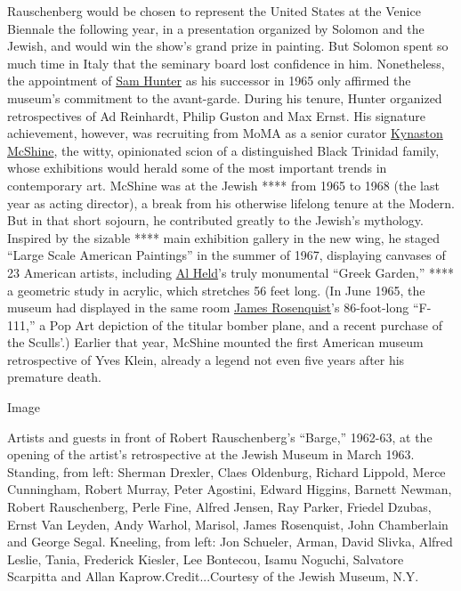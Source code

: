 Rauschenberg would be chosen to represent the United States at the
Venice Biennale the following year, in a presentation organized by
Solomon and the Jewish, and would win the show's grand prize in
painting. But Solomon spent so much time in Italy that the seminary
board lost confidence in him. Nonetheless, the appointment of
\href{https://www.nytimes3xbfgragh.onion/2014/08/26/arts/sam-hunter-curator-and-museum-founder-dies-at-91.html}{Sam
Hunter} as his successor in 1965 only affirmed the museum's commitment
to the avant-garde. During his tenure, Hunter organized retrospectives
of Ad Reinhardt, Philip Guston and Max Ernst. His signature achievement,
however, was recruiting from MoMA as a senior curator
\href{https://stories.thejewishmuseum.org/the-jewish-museum-remembers-kynaston-mcshine-1d6741c02815}{Kynaston
McShine}, the witty, opinionated scion of a distinguished Black Trinidad
family, whose exhibitions would herald some of the most important trends
in contemporary art. McShine was at the Jewish **** from 1965 to 1968
(the last year as acting director), a break from his otherwise lifelong
tenure at the Modern. But in that short sojourn, he contributed greatly
to the Jewish's mythology. Inspired by the sizable **** main exhibition
gallery in the new wing, he staged ``Large Scale American Paintings'' in
the summer of 1967, displaying canvases of 23 American artists,
including
\href{https://www.nytimes3xbfgragh.onion/2016/05/02/t-magazine/art/al-held-brushstroke-drawings.html}{Al
Held}'s truly monumental ``Greek Garden,'' **** a geometric study in
acrylic, which stretches 56 feet long. (In June 1965, the museum had
displayed in the same room
\href{https://www.nytimes3xbfgragh.onion/2016/03/18/arts/design/james-rosenquist-and-erro-discuss-a-long-friendship-forged-in-pop-art.html}{James
Rosenquist}'s 86-foot-long ``F-111,'' a Pop Art depiction of the titular
bomber plane, and a recent purchase of the Sculls'.) Earlier that year,
McShine mounted the first American museum retrospective of Yves Klein,
already a legend not even five years after his premature death.

Image

Artists and guests in front of Robert Rauschenberg's ``Barge,'' 1962-63,
at the opening of the artist's retrospective at the Jewish Museum in
March 1963. Standing, from left: Sherman Drexler, Claes Oldenburg,
Richard Lippold, Merce Cunningham, Robert Murray, Peter Agostini, Edward
Higgins, Barnett Newman, Robert Rauschenberg, Perle Fine, Alfred Jensen,
Ray Parker, Friedel Dzubas, Ernst Van Leyden, Andy Warhol, Marisol,
James Rosenquist, John Chamberlain and George Segal. Kneeling, from
left: Jon Schueler, Arman, David Slivka, Alfred Leslie, Tania, Frederick
Kiesler, Lee Bontecou, Isamu Noguchi, Salvatore Scarpitta and Allan
Kaprow.Credit...Courtesy of the Jewish Museum, N.Y.

